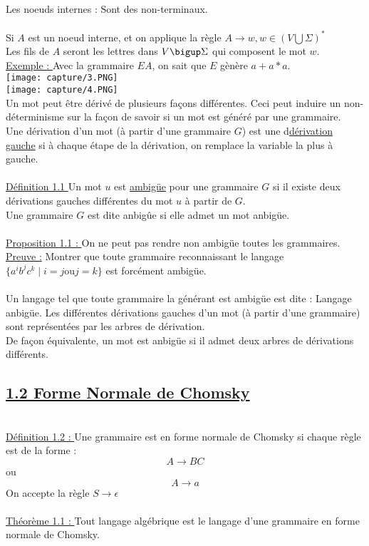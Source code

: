 \documentclass{article}
\begin{document}
    Les noeuds internes : Sont des non-terminaux. \\ 
    \\
    Si $A$ est un noeud interne, et on applique la règle $A \rightarrow w, w \in (V \bigcup \Sigma)^*$ \\ 
    Les fils de $A$ seront les lettres dans $V \bigup \Sigma$ qui composent le mot $w$. \\
    \underline{Exemple : } Avec la grammaire $EA$, on sait que $E$ gènère $a+a*a$. \\
    \texttt{[image: capture/3.PNG]} \\
    \texttt{[image: capture/4.PNG]} \\
    Un mot peut être dérivé de plusieurs façons différentes. Ceci peut induire un non-déterminisme sur la façon de savoir si un mot est généré par une grammaire. \\ 
    Une dérivation d'un mot (à partir d'une grammaire $G$) est une d\underline{dérivation gauche} si à chaque étape de la dérivation, on remplace la variable la plus à gauche. \\
    \\ 
    \underline{Définition 1.1 } Un mot $u$ est \underline{ambigüe} pour une grammaire $G$ si il existe deux dérivations gauches différentes du mot $u$ à partir de $G$. \\
    Une grammaire $G$ est dite anbigûe si elle admet un mot anbigüe. \\ 
    \\ 
    \underline{Proposition 1.1 : } On ne peut pas rendre non ambigüe toutes les grammaires. \\
    \underline{Preuve :} Montrer que toute grammaire reconnaissant le langage $\{a^ib^jc^k \mid i=j \text{ou} j=k\}$ est forcément ambigüe. \\
    \\
    Un langage tel que toute grammaire la générant est ambigüe est dite : Langage anbigüe.
    \newpage 
    Les différentes dérivations gauches d'un mot (à partir d'une grammaire) sont représentées par les arbres de dérivation. \\ 
    De façon équivalente, un mot est anbigüe si il admet deux arbres de dérivations différents. \\
    \subsection*{\underline{1.2 Forme Normale de Chomsky}} \\ 
    \underline{Définition 1.2 : } Une grammaire est en forme normale de Chomsky si chaque règle est de la forme : 
    \begin{equation*}
        A \rightarrow BC 
    \end{equation*}
    ou 
    \begin{equation*}
        A \rightarrow a
    \end{equation*}
    On accepte la règle $S \rightarrow \epsilon$ \\
    \\ 
    \underline{Théorème 1.1 : } Tout langage algébrique est le langage d'une grammaire en forme normale de Chomsky. \\
    
\end{document}
